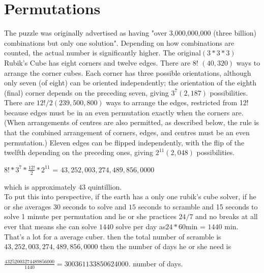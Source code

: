 \documentclass{article}
\begin{document}
\section{Permutations}
The puzzle was originally advertised as having "over 3,000,000,000 (three billion) combinations but only one solution". Depending on how combinations are counted, the actual number is significantly higher.
The original$ (3*3*3)$ Rubik's Cube has eight corners and twelve edges. There are $8!$ $(40,320)$ ways to arrange the corner cubes. Each corner has three possible orientations, although only seven (of eight) can be oriented independently; the orientation of the eighth (final) corner depends on the preceding seven, giving $3^{7} (2,187)$ possibilities. There are $12!/2 (239,500,800)$ ways to arrange the edges, restricted from 12! because edges must be in an even permutation exactly when the corners are. (When arrangements of centres are also permitted, as described below, the rule is that the combined arrangement of corners, edges, and centres must be an even permutation.) Eleven edges can be flipped independently, with the flip of the twelfth depending on the preceding ones, giving $2^{11} (2,048)$ possibilities.\cite{wong2010group}\\

\begin{center}
    $ 8! * 3^{7} * \frac{12!}{2} * 2^{11} $ = $43,252,003,274,489,856,0000$
\end{center}
which is approximately $43$ quintillion.\\
To put this into perspective, if the earth has a only one rubik's cube solver, if he or she averages $30$ seconds to solve and $15$ seconds to scramble and 15 seconds to solve 1 minute per permutation and he or she practices $24/7$ and no breaks at all ever that means she can solve $1440$ solve per day as$ 24 * 60 $min = $1440$ min. That's a lot for a average cuber. then the total number of scramble is $43,252,003,274,489,856,0000$ then the number of days he or she need is\\
\begin{center}
   $\frac{43252003274489856000}{1440}=300361133850624000$.  number of days.\\
\end{center}
\end{document}
